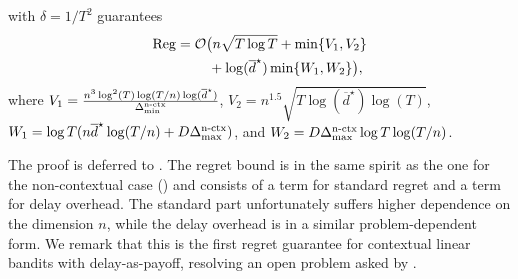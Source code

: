\begin{theorem}\label{thm:reduction}
     with %
    $\delta = 1/T^2$ guarantees
    \begin{align*}
        &{\mathrm{Reg}} =\mathcal{O}\big(n\sqrt{T\log T}+\min\{V_1,V_2\} \\
        &\quad\quad\quad\quad +\log(\overline{d}^\star)\min\{W_1,W_2\}\big),
    \end{align*}
     where $V_1=\frac{n^3\log^2(T)\log(T/n)\log(\overline{d}^\star)}{\Delta_{\min}^{\text{n-ctx}}}$, $V_2=n^{1.5}\sqrt{T\log(\overline{d}^\star)\log(T)}$, $W_1=\log T(n\overline{d}^\star\log(T/n)+D\Delta_{\max}^{\text{n-ctx}})$, and $W_2=D\Delta_{\max}^{\text{n-ctx}}\log T\log(T/n)$.
\end{theorem}
The proof is deferred to . 
The regret bound is in the same spirit as the one for the non-contextual case () and consists of a term for standard regret and a term for delay overhead.
The standard part unfortunately suffers higher dependence on the dimension $n$, while the delay overhead is in a similar problem-dependent form.
We remark that this is the first regret guarantee for contextual linear bandits with delay-as-payoff, resolving an open problem asked by \citep{schlisselberg2024delay}.